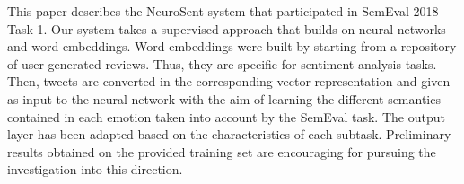 This paper describes the NeuroSent system that participated in SemEval 2018 Task 1. Our system takes a supervised approach that builds on neural networks and word embeddings. Word embeddings were built by starting from a repository of user generated reviews. Thus, they are specific for sentiment analysis tasks. Then, tweets are converted in the corresponding vector representation and given as input to the neural network with the aim of learning the different semantics contained in each emotion taken into account by the SemEval task. The output layer has been adapted based on the characteristics of each subtask. Preliminary results obtained on the provided training set are encouraging for pursuing the investigation into this direction.
